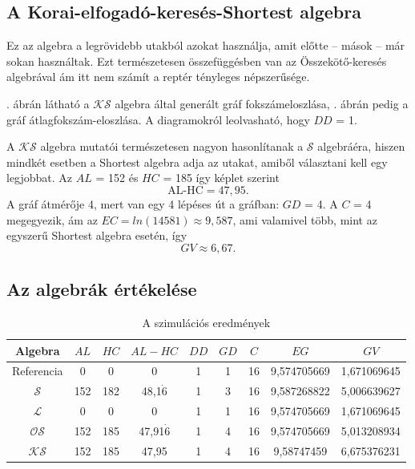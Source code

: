   \subsection{A Korai-elfogadó-keresés-Shortest algebra}
  Ez az algebra a legrövidebb utakból azokat használja, amit előtte -- mások -- már sokan használtak. Ezt természetesen összefüggésben van az Összekötő-keresés algebrával ám itt nem számít a reptér tényleges népszerűsége.

  . ábrán látható a $\mathcal{KS}$ algebra által generált gráf fokszámeloszlása, . ábrán pedig a gráf átlagfokszám-eloszlása. A diagramokról leolvasható, hogy $DD$ = 1.

  A $\mathcal{KS}$ algebra mutatói természetesen nagyon hasonlítanak a $\mathcal{S}$ algebráéra, hiszen mindkét esetben a Shortest algebra adja az utakat, amiből választani kell egy legjobbat. Az $AL$ = 152 és $HC$ = 185 így  képlet szerint $$\text{AL-HC} = 47,95.$$
  A gráf átmérője 4, mert van egy 4 lépéses út a gráfban: $GD$ = 4. A $C$ = 4 megegyezik, ám az $EC=ln(14581) \approx 9,587$, ami valamivel több, mint az egyszerű Shortest algebra esetén, így $$GV \approx 6,67.$$
  \newpage

  \subsection{Az algebrák értékelése}
  \renewcommand{\arraystretch}{1.2}
  \begin{table}[ht]
    \centering
      \begin{tabular}{| c || c | c || c || c | c | c | c || c |}
      \hline
      \textbf{Algebra} & $AL$ & $HC$ & $AL-HC$ & $DD$ & $GD$ & $C$ & $EG$ & $GV$\\
      \hline
      Referencia & 0 & 0 & 0 & 1 & 1 & 16 & 9,574705669 & 1,671069645\\
      $\mathcal{S}$ & 152 & 182 & 48,1$\dot{6}$ & 1 & 3 & 16 & 9,587268822 & 5,006639627\\
      $\mathcal{L}$ & 0 & 0 & 0 & 1 & 1 & 16 & 9,574705669 & 1,671069645 \\
      $\mathcal{OS}$ & 152 & 185 & 47,91$\dot{6}$ & 1 & 4 & 16 & 9,574705669 & 5,013208934\\
      $\mathcal{KS}$ & 152 & 185 & 47,95 & 1 & 4 & 16 & 9,58747459 & 6,675376231\\
      \hline
      \end{tabular}
    \caption{A szimulációs eredmények}
    \label{tab:eredmenyek}
  \end{table}

